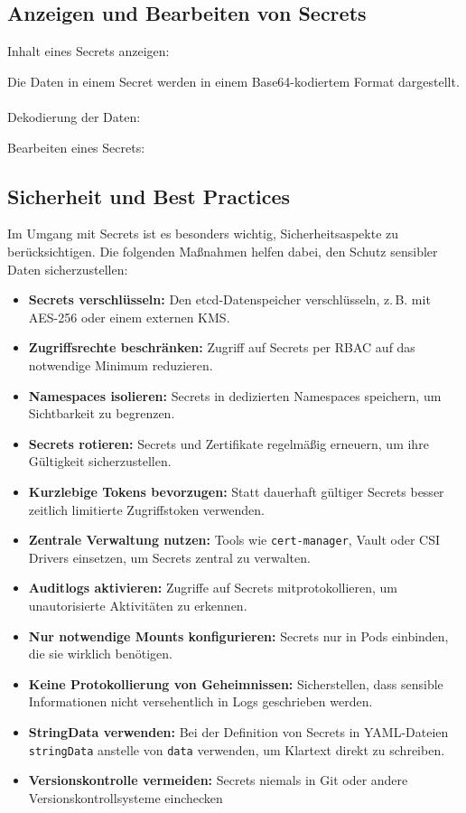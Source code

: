 \subsection{Anzeigen und Bearbeiten von Secrets}
Inhalt eines Secrets anzeigen:

Die Daten in einem Secret werden in einem Base64-kodiertem Format dargestellt.\\
\\
\noindent
Dekodierung der Daten:

\noindent
Bearbeiten eines Secrets:


\subsection{Sicherheit und Best Practices}

Im Umgang mit Secrets ist es besonders wichtig, Sicherheitsaspekte zu berücksichtigen. Die folgenden Maßnahmen helfen dabei, den Schutz sensibler Daten sicherzustellen:

\begin{itemize}
  \item \textbf{Secrets verschlüsseln:} Den etcd-Datenspeicher verschlüsseln, z.\,B. mit AES-256 oder einem externen KMS.
  \item \textbf{Zugriffsrechte beschränken:} Zugriff auf Secrets per RBAC auf das notwendige Minimum reduzieren.
  \item \textbf{Namespaces isolieren:} Secrets in dedizierten Namespaces speichern, um Sichtbarkeit zu begrenzen.
  \item \textbf{Secrets rotieren:} Secrets und Zertifikate regelmäßig erneuern, um ihre Gültigkeit sicherzustellen.
  \item \textbf{Kurzlebige Tokens bevorzugen:} Statt dauerhaft gültiger Secrets besser zeitlich limitierte Zugriffstoken verwenden.
  \item \textbf{Zentrale Verwaltung nutzen:} Tools wie \texttt{cert-manager}, Vault oder CSI Drivers einsetzen, um Secrets zentral zu verwalten.
  \item \textbf{Auditlogs aktivieren:} Zugriffe auf Secrets mitprotokollieren, um unautorisierte Aktivitäten zu erkennen.
  \item \textbf{Nur notwendige Mounts konfigurieren:} Secrets nur in Pods einbinden, die sie wirklich benötigen.
  \item \textbf{Keine Protokollierung von Geheimnissen:} Sicherstellen, dass sensible Informationen nicht versehentlich in Logs geschrieben werden.
  \item \textbf{StringData verwenden:} Bei der Definition von Secrets in YAML-Dateien \texttt{stringData} anstelle von \texttt{data} verwenden, um Klartext direkt zu schreiben.
  \item \textbf{Versionskontrolle vermeiden:} Secrets niemals in Git oder andere Versionskontrollsysteme einchecken
\end{itemize}

